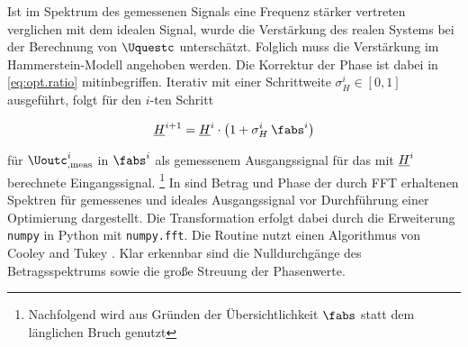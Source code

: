 \documentclass[../Report.tex]{subfiles}
\begin{document}
Ist im Spektrum des gemessenen Signals eine Frequenz stärker vertreten verglichen mit dem idealen Signal, wurde die Verstärkung des realen Systems bei der Berechnung von $\Uquestc$ unterschätzt. Folglich muss die Verstärkung im Hammerstein-Modell angehoben werden. Die Korrektur der Phase ist dabei in \eqref{eq:opt.ratio} mitinbegriffen.
Iterativ mit einer Schrittweite $\sigma_H^i \in \left[ 0 , 1 \right]$ ausgeführt, folgt für den $i$-ten Schritt

\begin{align}
\label{eq:opt.Hnew}
	\Hcompl^{i+1}
		=\Hcompl^{i} \cdot
		\left( 1 + \sigma_H^i \: \fabs^{i}	\right)					 
\end{align}

für $\Uoutc_{, \mathrm{meas}}^{i}$ in $\fabs^{i}$ als gemessenem Ausgangssignal für das mit $\underline{H}^{i}$ berechnete Eingangssignal.
\footnote{Nachfolgend wird aus Gründen der Übersichtlichkeit $\fabs$ statt dem länglichen Bruch genutzt} 
In  sind Betrag und Phase der durch FFT erhaltenen Spektren für gemessenes und ideales Ausgangssignal vor Durchführung einer Optimierung dargestellt. Die Transformation erfolgt dabei durch die Erweiterung \lstinline{numpy} in Python mit \lstinline{numpy.fft}. Die Routine nutzt einen Algorithmus von Cooley and Tukey \cite[S. 297-301]{cooley65}.
Klar erkennbar sind die Nulldurchgänge des Betragsspektrums sowie die große Streuung der Phasenwerte. 
\\

 \absSpectIdeal 
{} \absSpectMeas
{} \angleSpectIdeal 
{} \angleSpectMeas 
\end{document}
